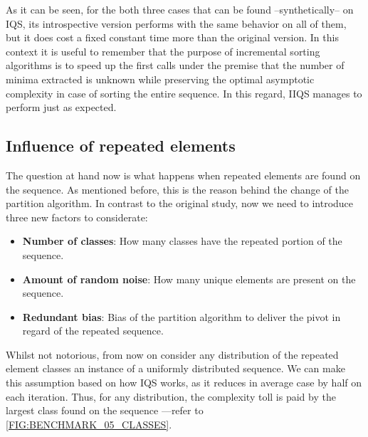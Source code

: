 As it can be seen, for the both three cases that can be found --synthetically-- on IQS, its introspective version performs with the same behavior on all of them, but it does cost a fixed constant time more than the original version. In this context it is useful to remember that the purpose of incremental sorting algorithms is to speed up the first calls under the premise that the number of minima extracted is unknown while preserving the optimal asymptotic complexity in case of sorting the entire sequence. In this regard, IIQS manages to perform just as expected.\\

\subsection{Influence of repeated elements}

The question at hand now is what happens when repeated elements are found on the sequence. As mentioned before, this is the reason behind the change of the partition algorithm. In contrast to the original study, now we need to introduce three new factors to considerate:

\begin{itemize}
    \item \textbf{Number of classes}: How many classes have the repeated portion of the sequence.
    \item \textbf{Amount of random noise}: How many unique elements are present on the sequence.
    \item \textbf{Redundant bias}: Bias of the partition algorithm to deliver the pivot in regard of the repeated sequence.
\end{itemize}

Whilst not notorious, from now on consider any distribution of the repeated element classes an instance of a uniformly distributed sequence. We can make this assumption based on how IQS works, as it reduces in average case by half on each iteration. Thus, for any distribution, the complexity toll is paid by the largest class found on the sequence ---refer to \ref{FIG:BENCHMARK_05_CLASSES}.\\

